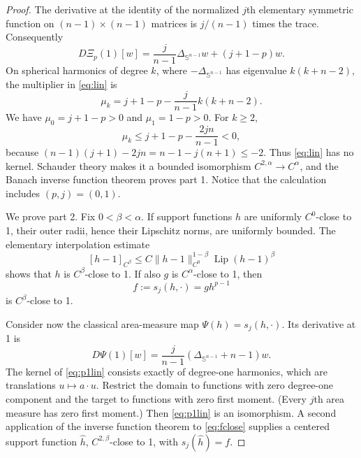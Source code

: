 \documentclass[11pt]{article}
\newcommand{\Sn}{\mathbb S^{n-1}}
\begin{document}
\begin{proof}
The derivative at the identity of the normalized $j$th elementary symmetric
function on $(n-1)\times(n-1)$ matrices is $j/(n-1)$ times the trace.
Consequently
\begin{equation}\label{eq:lin}
 D\Xi_p(1)[w]
 =\frac{j}{n-1}\Delta_{\Sn}w+(j+1-p)w.
\end{equation}
On spherical harmonics of degree $k$, where
$-\Delta_{\Sn}$ has eigenvalue $k(k+n-2)$, the multiplier in
\eqref{eq:lin} is
\begin{equation}\label{eq:mu}
 \mu_k=j+1-p-\frac{j}{n-1}k(k+n-2).
\end{equation}
We have $\mu_0=j+1-p>0$ and $\mu_1=1-p>0$.  For $k\ge2$,
\[
 \mu_k\le j+1-p-\frac{2jn}{n-1}<0,
\]
because
$(n-1)(j+1)-2jn=n-1-j(n+1)\le-2$.
Thus \eqref{eq:lin} has no kernel.  Schauder theory makes it a bounded
isomorphism $C^{2,\alpha}\to C^\alpha$, and the Banach inverse function
theorem proves part 1.  Notice that the calculation includes $(p,j)=(0,1)$.

We prove part 2.  Fix $0<\beta<\alpha$.  If support functions $h$ are
uniformly $C^0$-close to 1, their outer radii, hence their Lipschitz norms,
are uniformly bounded.  The elementary interpolation estimate
\begin{equation}\label{eq:interp}
 [h-1]_{C^\beta}
 \le C\|h-1\|_{C^0}^{1-\beta}
       \operatorname{Lip}(h-1)^\beta
\end{equation}
shows that $h$ is $C^\beta$-close to 1.  If also $g$ is $C^\alpha$-close
to 1, then
\begin{equation}\label{eq:fclose}
 f:=s_j(h,\cdot)=g h^{p-1}
\end{equation}
is $C^\beta$-close to 1.

Consider now the classical area-measure map $\Psi(h)=s_j(h,\cdot)$.
Its derivative at 1 is
\begin{equation}\label{eq:p1lin}
 D\Psi(1)[w]=\frac{j}{n-1}(\Delta_{\Sn}+n-1)w.
\end{equation}
The kernel of \eqref{eq:p1lin} consists exactly of degree-one harmonics,
which are translations $u\mapsto a\cdot u$.  Restrict the domain to
functions with zero degree-one component and the target to functions with
zero first moment.  (Every $j$th area measure has zero first moment.)
Then \eqref{eq:p1lin} is an isomorphism.  A second application of the
inverse function theorem to \eqref{eq:fclose} supplies a centered support
function $\widehat h$, $C^{2,\beta}$-close to 1, with
$s_j(\widehat h)=f$.


\end{proof}
\end{document}
